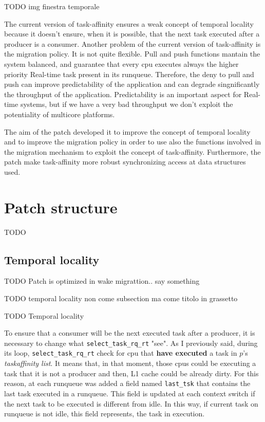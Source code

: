 TODO img finestra temporale

The current version of task-affinity ensures a weak concept of temporal locality because it doesn't ensure, when it is possible, that the next task executed
after a producer is a consumer. Another problem of the current version of task-affinity is the migration policy. It is not quite flexible. Pull and push 
functions mantain the system balanced, and guarantee that every cpu executes always the higher priority Real-time task present in its runqueue.
Therefore, the deny to pull and push can improve predictability of the application and can degrade singnificantly the throughput of the application.
Predictability is an important aspect for Real-time systems, but if we have a very bad throughput we don't exploit the potentiality of multicore platforms.

The aim of the patch developed it to improve the concept of temporal locality and to improve the migration policy in order to use also the functions 
involved in the migration mechanism to exploit the concept of task-affinity. Furthermore, the patch make task-affinity more robust synchronizing access at 
data structures used.

\section{Patch structure}

TODO

\subsection{Temporal locality}

TODO Patch is optimized in wake migrattion.. say something

TODO temporal locality non come subsection ma come titolo in grassetto

TODO Temporal locality

To ensure that a consumer will be the next executed task after a producer, it is necessary to change what \texttt{select\_task\_rq\_rt} "see". As I 
previously said, during its loop, \texttt{select\_task\_rq\_rt} check for cpu that \textbf{have executed} a task in $p$'s \textit{taskaffinity list}. 
It means that, in that moment, those cpus could be executing a task that it is not a producer and then, L1 cache could be already dirty. For this reason, 
at each runqueue was added a field named \texttt{last\_tsk} that contains the last task executed in a runqueue. This field is updated at each context switch 
if the next task to be executed is different from idle. In this way, if current task on runqueue is not idle, this field represents, the task in execution. 


